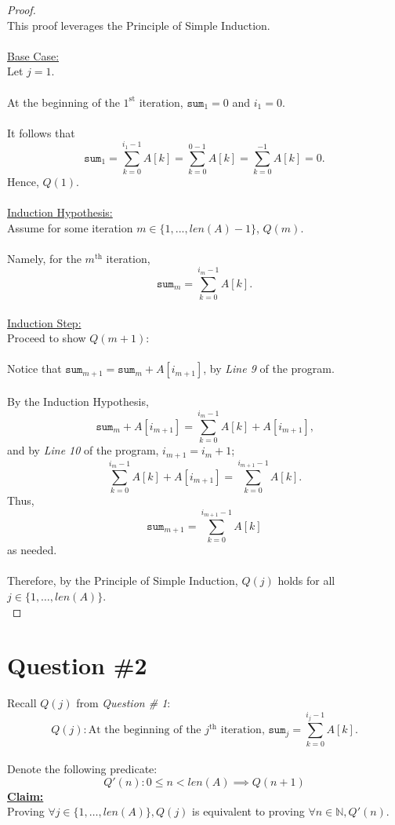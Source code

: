 \documentclass[12pt]{article}
\begin{document}
\begin{proof}
\leavevmode\\
    This proof leverages the Principle of Simple Induction. \\
    \\
    \underline{Base Case:} \\
    Let $j = 1$. \\
    \\
    At the beginning of the $1^{\text{st}}$ iteration, $\texttt{sum}_1 = 0$ and $i_1 = 0$. \\
    \\
    It follows that
    \[
    \texttt{sum}_1 = \sum_{k=0}^{i_1-1} A[k]
    = \sum_{k=0}^{0-1} A[k]
    = \sum_{k=0}^{-1} A[k]
    = 0\text{.}
    \]
    Hence, \(Q(1)\). \\
    \\
    \underline{Induction Hypothesis:} \\
    Assume for some iteration $m \in \{ 1, ..., len(A) - 1 \}$, $Q(m)$. \\
    \\
    Namely, for the $m^{\text{th}}$ iteration,
    \[\texttt{sum}_m = \sum_{k = 0}^{i_m - 1} A[k] \text{.}\]
    \\
    \underline{Induction Step:} \\
    Proceed to show \(Q(m + 1)\): \\
    \\
    Notice that \(\texttt{sum}_{m + 1} = \texttt{sum}_m + A[i_{m + 1}]\), by \textit{Line 9} of the program. \\
    \\
    By the Induction Hypothesis,
    \[
    \texttt{sum}_m + A[i_{m + 1}]
    = \sum_{k = 0}^{i_m - 1} A[k] + A[i_{m + 1}] \text{,}
    \]
    and by \textit{Line 10} of the program, \(i_{m + 1} = i_m + 1\);
    \[
    \sum_{k = 0}^{i_m - 1} A[k] + A[i_{m + 1}]
    = \sum_{k = 0}^{i_{m + 1} - 1} A[k] \text{.}
    \]
    Thus,
    \[
    \texttt{sum}_{m + 1} = \sum_{k = 0}^{i_{m + 1} - 1} A[k]
    \]
    as needed. \\
    \\
    Therefore, by the Principle of Simple Induction, $Q(j)$ holds for all $j \in \{1, \dots, len(A)\}$. \\
\end{proof}
\pagebreak
\section*{Question \#2}
Recall \(Q(j)\) from \textit{Question \# 1}: \\
\[
Q(j): \text{At the beginning of the } j^{\text{th}} \text{ iteration, } \texttt{sum}_j = \sum_{k=0}^{i_j-1} A[k].
\]
\\
Denote the following predicate:
\[
    Q'(n): 0 \leq n < len(A) \implies Q(n + 1)
\]
\textbf{\underline{Claim:}} \\
Proving $\forall j \in \{ 1, \dots, len(A) \}, Q(j)$ is equivalent to proving $\forall n \in \mathbb{N}, Q'(n)$.
\end{document}

